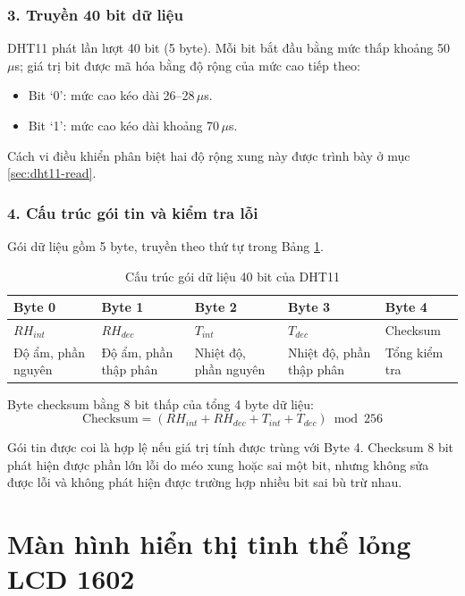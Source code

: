 \subsubsection{3. Truyền 40 bit dữ liệu}
DHT11 phát lần lượt 40 bit (5 byte). Mỗi bit bắt đầu bằng mức thấp khoảng 50\,$\mu$s; giá trị bit được mã hóa bằng độ rộng của mức cao tiếp theo:
\begin{itemize}[leftmargin=1.2cm]
    \item Bit `0': mức cao kéo dài 26--28\,$\mu$s.
    \item Bit `1': mức cao kéo dài khoảng 70\,$\mu$s.
\end{itemize}

Cách vi điều khiển phân biệt hai độ rộng xung này được trình bày ở mục \ref{sec:dht11-read}.

\subsubsection{4. Cấu trúc gói tin và kiểm tra lỗi}
Gói dữ liệu gồm 5 byte, truyền theo thứ tự trong Bảng \ref{tab:dht11-frame}.

\begin{table}[H]
\centering
\small
\caption{Cấu trúc gói dữ liệu 40 bit của DHT11}
\label{tab:dht11-frame}
\renewcommand{\arraystretch}{1.15}
\begin{tabularx}{\textwidth}{*{5}{>{\centering\arraybackslash}X}}
\toprule
Byte 0 & Byte 1 & Byte 2 & Byte 3 & Byte 4 \\
\midrule
$RH_{int}$ & $RH_{dec}$ & $T_{int}$ & $T_{dec}$ & Checksum \\
Độ ẩm, phần nguyên & Độ ẩm, phần thập phân & Nhiệt độ, phần nguyên & Nhiệt độ, phần thập phân & Tổng kiểm tra \\
\bottomrule
\end{tabularx}
\end{table}

Byte checksum bằng 8 bit thấp của tổng 4 byte dữ liệu:
\begin{equation}
    \text{Checksum} = (RH_{int} + RH_{dec} + T_{int} + T_{dec}) \bmod 256
\end{equation}

Gói tin được coi là hợp lệ nếu giá trị tính được trùng với Byte 4. Checksum 8 bit phát hiện được phần lớn lỗi do méo xung hoặc sai một bit, nhưng không sửa được lỗi và không phát hiện được trường hợp nhiều bit sai bù trừ nhau.

\section{Màn hình hiển thị tinh thể lỏng LCD 1602}


